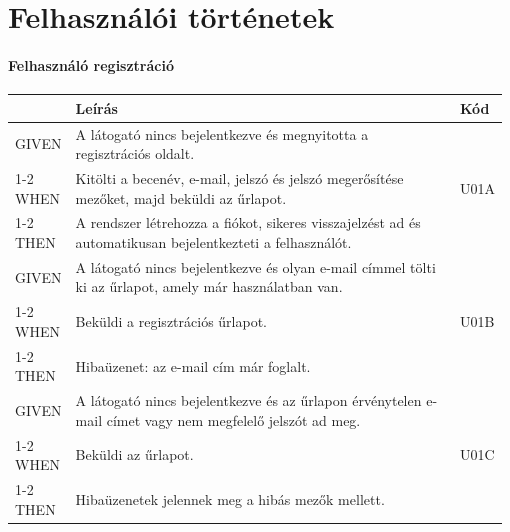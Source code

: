 \chapter{Felhasználói történetek}
\label{ch:stories}


\subsubsection{Felhasználó regisztráció}
\begin{table}[H]
	\centering
	\begin{tabular}{|m{0.12\linewidth}|m{0.78\linewidth}|m{0.08\linewidth}|}
		\hline
		& \textbf{Leírás} & \textbf{Kód} \\\hline
		GIVEN & A látogató nincs bejelentkezve és megnyitotta a regisztrációs oldalt. & \multirow{3}{*}{U01A} \\\cline{1-2}
		WHEN  & Kitölti a becenév, e-mail, jelszó és jelszó megerősítése mezőket, majd beküldi az űrlapot. & \\\cline{1-2}
		THEN  & A rendszer létrehozza a fiókot, sikeres visszajelzést ad és automatikusan bejelentkezteti a felhasználót. & \\\hline

		GIVEN & A látogató nincs bejelentkezve és olyan e-mail címmel tölti ki az űrlapot, amely már használatban van. & \multirow{3}{*}{U01B} \\\cline{1-2}
		WHEN  & Beküldi a regisztrációs űrlapot. & \\\cline{1-2}
		THEN  & Hibaüzenet: az e-mail cím már foglalt. & \\\hline

		GIVEN & A látogató nincs bejelentkezve és az űrlapon érvénytelen e-mail címet vagy nem megfelelő jelszót ad meg. & \multirow{3}{*}{U01C} \\\cline{1-2}
		WHEN  & Beküldi az űrlapot. & \\\cline{1-2}
		THEN  & Hibaüzenetek jelennek meg a hibás mezők mellett. & \\\hline
	\end{tabular}
\end{table}

